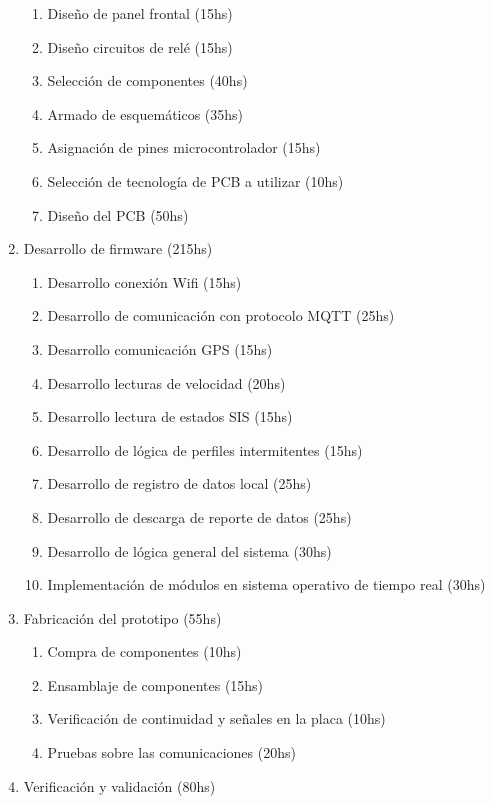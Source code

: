 \begin{enumerate}
\begin{enumerate}
        \item Diseño de panel frontal (15hs)
        \item Diseño circuitos de relé (15hs)
        \item Selección de componentes (40hs)
        \item Armado de esquemáticos (35hs)
        \item Asignación de pines microcontrolador (15hs)
        \item Selección de tecnología de PCB a utilizar (10hs)
        \item Diseño del PCB (50hs)
    \end{enumerate}
    \item Desarrollo de firmware (215hs)
    \begin{enumerate}
        \item Desarrollo conexión Wifi (15hs)
        \item Desarrollo de comunicación con protocolo MQTT (25hs)
        \item Desarrollo comunicación GPS (15hs)
        \item Desarrollo lecturas de velocidad (20hs)
        \item Desarrollo lectura de estados SIS (15hs)
        \item Desarrollo de lógica de perfiles intermitentes (15hs)
        \item Desarrollo de registro de datos local (25hs)
        \item Desarrollo de descarga de reporte de datos (25hs)
        \item Desarrollo de lógica general del sistema (30hs)
        \item Implementación de módulos en sistema operativo de tiempo real (30hs)
    \end{enumerate}
    \item Fabricación del prototipo (55hs)
    \begin{enumerate}
        \item Compra de componentes (10hs)
        \item Ensamblaje de componentes (15hs)
        \item Verificación de continuidad y señales en la placa (10hs)
        \item Pruebas sobre las comunicaciones (20hs)
    \end{enumerate}
    \item Verificación y validación (80hs)
    \begin{enumerate}

\end{enumerate}
\end{enumerate}
